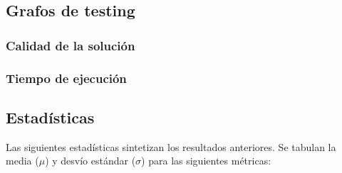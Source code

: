 \documentclass[a4paper, 10pt, twoside]{article}
\begin{document}
\begin{figure}[H]
	
\end{figure}

\begin{figure}[H]
	
\end{figure}


\subsection{Grafos de testing}


\subsubsection{Calidad de la solución}

\begin{figure}[H]
	
\end{figure}

\begin{figure}[H]
	
\end{figure}

\begin{figure}[H]
	
\end{figure}


\subsubsection{Tiempo de ejecución}

\begin{figure}[H]
	
\end{figure}

\begin{figure}[H]
	
\end{figure}

\begin{figure}[H]
	
\end{figure}


\subsection{Estadísticas}

Las siguientes estadísticas sintetizan los resultados anteriores. Se tabulan la media ($\mu$) y desvío estándar ($\sigma$) para las siguientes métricas:
\end{document}
